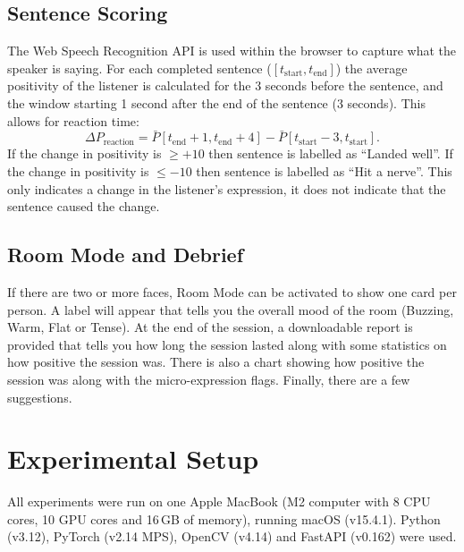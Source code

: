 \documentclass[conference]{IEEEtran}
\begin{document}
\subsection{Sentence Scoring}
The Web Speech Recognition API is used within the browser to capture what the speaker is saying. For each completed sentence ($[t_{\text{start}}, t_{\text{end}}]$) the average positivity of the listener is calculated for the 3 seconds before the sentence, and the window starting 1 second after the end of the sentence (3 seconds). This allows for reaction time:
\begin{equation}
\Delta P_{\text{reaction}} = \bar{P}[t_{\text{end}}+1, t_{\text{end}}+4] - \bar{P}[t_{\text{start}}-3, t_{\text{start}}].
\end{equation}
If the change in positivity is $\ge +10$ then sentence is labelled as ``Landed well''. If the change in positivity is $\le -10$ then sentence is labelled as ``Hit a nerve''. This only indicates a change in the listener's expression, it does not indicate that the sentence caused the change.

\subsection{Room Mode and Debrief}
If there are two or more faces, Room Mode can be activated to show one card per person. A label will appear that tells you the overall mood of the room (Buzzing, Warm, Flat or Tense). At the end of the session, a downloadable report is provided that tells you how long the session lasted along with some statistics on how positive the session was. There is also a chart showing how positive the session was along with the micro-expression flags. Finally, there are a few suggestions.

\section{Experimental Setup}
All experiments were run on one Apple MacBook (M2 computer with 8 CPU cores, 10 GPU cores and 16\,GB of memory), running macOS (v15.4.1). Python (v3.12), PyTorch (v2.14 MPS), OpenCV (v4.14) and FastAPI (v0.162) were used.
\end{document}
